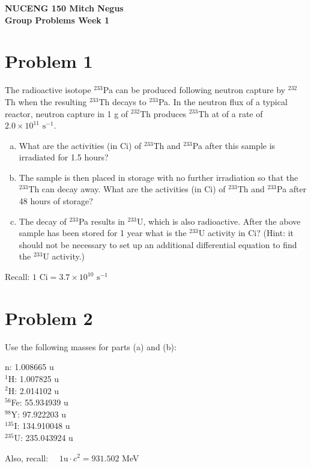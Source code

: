 \documentclass{report}
\newcommand{\tab}{\-\hspace{1.5cm}}
\begin{document}
\textbf{\large NUCENG 150 \hfill Mitch Negus}\\ 
\textbf{Group Problems Week 1}


\section*{Problem 1}
The radioactive isotope $^{233}$Pa can be produced following neutron capture by $^{232}$Th when the resulting $^{233}$Th decays to $^{233}$Pa. In the neutron flux of a typical reactor, neutron capture in 1 g of $^{232}$Th produces $^{233}$Th at of a rate of $2.0 \times 10^{11}\text{ s}^{-1}$.
\begin{enumerate}[a)]
\item What are the activities (in Ci) of $^{233}$Th and $^{233}$Pa after this sample is irradiated for 1.5 hours?
\item The sample is then placed in storage with no further irradiation so that the $^{233}$Th can decay away. What are
the activities (in Ci) of $^{233}$Th and $^{233}$Pa after 48 hours of storage?
\item The decay of $^{233}$Pa results in $^{233}$U, which is also radioactive. After the above sample has been stored for 1 year what is the $^{233}$U activity in Ci? (Hint: it should not be necessary to set up an additional differential equation to find the $^{233}$U activity.)
\end{enumerate}

Recall: $1\text{ Ci} = 3.7 \times 10^{10}\text{ s}^{-1}$

\newpage
\section*{Problem 2}

Use the following masses for parts (a) and (b):

\tab n: 1.008665 u \\
\tab$^{1}$H: 1.007825 u \\
\tab$^{2}$H: 2.014102 u \\
\tab$^{56}$Fe: 55.934939 u \\
\tab$^{98}$Y: 97.922203 u \\
\tab$^{135}$I: 134.910048 u \\
\tab$^{235}$U: 235.043924 u

Also, recall: $\quad 1\text{u} \cdot c^{2} = 931.502$ MeV
\end{document}
